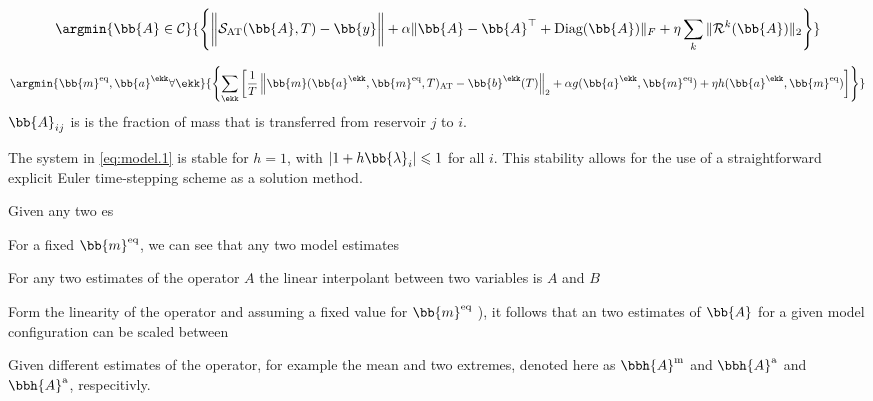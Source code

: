  
\begin{align}
    \argmin{ \bb{A} \in \mathcal{C} }{\left\{ 
    \bigg\| \mathcal{S}_{\text{AT}}(\bb{A},T) - \bb{y}  \bigg \| + \alpha \| \bb{A} - \bb{A}^\top + \text{Diag}(\bb{A})\|_{F} + \eta \sum_{k} \| \mathcal{R}^{k}(\bb{A})
    \|_2 \right\}
    }
\end{align}


\begin{align}
    \argmin{ \bb{m}^{\text{eq}}, \bb{a}^{\ekk} \forall \ekk }{\left\{ \sum_{\ekk} \left[ \frac{1}{T} \left\| \bb{m}(\bb{a}^{\ekk},\bb{m}^{\text{eq}},T)_{\text{AT}} - \bb{b}^{\ekk}(T) \right\|_{2} 
    + \alpha g(\bb{a}^{\ekk},\bb{m}^{\text{eq}}) 
    + \eta   h(\bb{a}^{\ekk},\bb{m}^{\text{eq}}) 
    \right ] \right\}
    }
\end{align}
$\bb{A}_{ij}$ is is the fraction of mass that is transferred from reservoir $j$ to $i$.






\newpage

The system in \eqref{eq:model.1} is stable for $h=1$, with $|1+h\bb{\lambda}_i| \leqslant 1$ for all $i$. This stability allows for the use of a straightforward explicit Euler time-stepping scheme as a solution method. 


Given any two es

For a fixed $\bb{m}^{\text{eq}}$, we can see that any two model estimates 

For any two estimates of the operator $A$ the linear interpolant between two variables is $A$ and $B$ 



Form the linearity of the operator and assuming a fixed value for $\bb{m}^{\text{eq}}$ ), it follows that an two estimates of $\bb{A}$ for a given model configuration can be scaled between 

Given different estimates of the operator, for example the mean and two extremes, denoted here as $\bbh{A}^\text{m}$ and $\bbh{A}^\text{a}$ and $\bbh{A}^\text{a}$, respecitivly.








